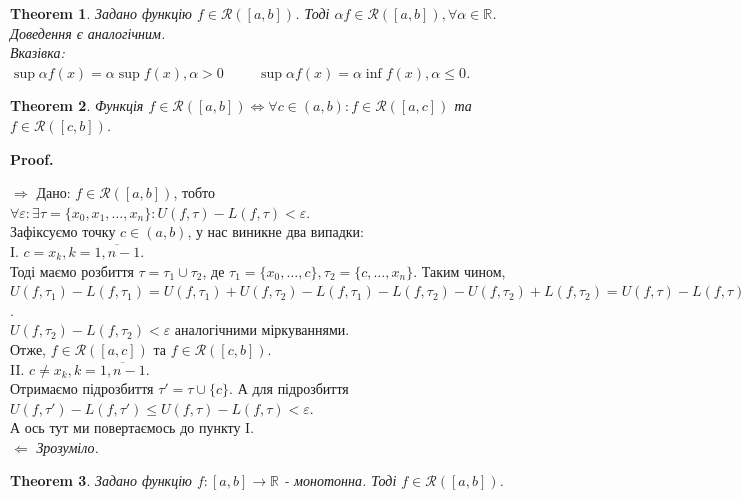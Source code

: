 \documentclass[a4paper, 10pt]{article}
\makeatletter
\def\huge{\displaystyle}
\def\qed{$\blacksquare$}
\def\rightproof{$\boxed{\Rightarrow}$ }
\def\leftproof{$\boxed{\Leftarrow}$ }
\theoremstyle{theoremdd}
\newtheorem{theorem}{Theorem}[subsection]
\theoremstyle{theoremdd}
\theoremstyle{theoremdd}
\theoremstyle{theoremdd}
\theoremstyle{theoremdd}
\theoremstyle{theoremdd}
\theoremstyle{theoremdd}
\theoremstyle{theoremdd}
\renewenvironment{proof}[1][Proof.\\]{\par
\pushQED{\hfill \qed}%
\normalfont \topsep6\p@\@plus6\p@\relax
\trivlist
\item\relax
{\bfseries
#1\@addpunct{.}}\hspace\labelsep\ignorespaces
}{%
\popQED\endtrivlist\@endpefalse
}
\makeatother
\begin{document}
\begin{theorem}
Задано функцію $f \in \mathcal{R}([a,b])$. Тоді $\alpha f \in \mathcal{R}([a,b]), \forall \alpha \in \mathbb{R}$.\\
\textit{Доведення є аналогічним.}\\
\textit{Вказівка: $\huge\sup \alpha f(x) = \alpha \sup f(x), \alpha > 0 \hspace{1cm} \sup \alpha f(x) = \alpha \inf f(x), \alpha \leq 0$}.
\end{theorem}

\begin{theorem}
Функція $f \in \mathcal{R}([a,b]) \iff \forall c \in (a,b): f \in \mathcal{R}([a,c])$ та $f \in \mathcal{R}([c,b])$.
\end{theorem}

\begin{proof}
\rightproof Дано: $f \in \mathcal{R}([a,b])$, тобто $\forall \varepsilon: \exists \tau = \{x_0,x_1,\dots,x_n\}: U(f, \tau) - L(f,\tau) < \varepsilon$.\\
Зафіксуємо точку $c \in (a,b)$, у нас виникне два випадки:\\
I. $c = x_k, k = \overline{1,n-1}$. \\
Тоді маємо розбиття $\tau = \tau_1 \cup \tau_2$, де $\tau_1 = \{x_0,\dots,c\}, \tau_2 = \{c,\dots,x_n\}$. Таким чином,\\
$U(f,\tau_1) - L(f,\tau_1) = U(f,\tau_1) + U(f,\tau_2) - L(f,\tau_1) - L(f,\tau_2) - U(f,\tau_2) + L(f,\tau_2) = U(f, \tau) - L(f,\tau) - (U(f,\tau_2) - L(f,\tau_2)) \leq U(f, \tau) - L(f,\tau) < \varepsilon$.\\
$U(f,\tau_2) - L(f,\tau_2) < \varepsilon$ аналогічними міркуваннями.\\
Отже, $f \in \mathcal{R}([a,c])$ та $f \in \mathcal{R}([c,b])$.
\bigskip \\
II. $c \neq x_k, k = \overline{1,n-1}$. \\
Отримаємо підрозбиття $\tau' = \tau \cup \{c\}$. А для підрозбиття $U(f,\tau') - L(f,\tau') \leq U(f,\tau) - L(f,\tau) < \varepsilon$.\\
А ось тут ми повертаємось до пункту I.
\bigskip \\

\leftproof \textit{Зрозуміло.}
\end{proof}

\begin{theorem}
Задано функцію $f: [a,b] \to \mathbb{R}$ - монотонна. Тоді $f \in \mathcal{R}([a,b])$.
\end{theorem}
\end{document}
